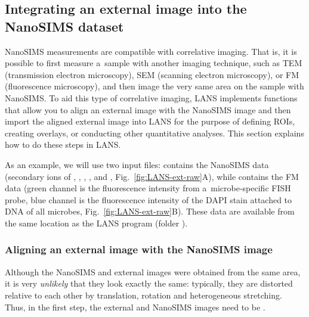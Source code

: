\subsection{Integrating an external image into the NanoSIMS dataset}
\setcounter{step}{0}

\goldbox{}
NanoSIMS measurements are compatible with correlative imaging. That is, it is possible to first measure a~sample with another imaging technique, such as TEM (transmission electron microscopy), SEM (scanning electron microscopy), or FM (fluorescence microscopy), and then image the very same area on the sample with NanoSIMS. To aid this type of correlative imaging, LANS implements functions that allow you to align an external image with the NanoSIMS image and then import the aligned external image into LANS for the purpose of defining ROIs, creating overlays, or conducting other quantitative analyses. This section explains how to do these steps in LANS.
\tcbe

As an example, we will use two input files:  contains the NanoSIMS data (secondary ions of , , , ,  and , Fig.~\ref{fig:LANS-ext-raw}A), while  contains the FM data (green channel is the fluorescence intensity from a~microbe-specific FISH probe, blue channel is the fluorescence intensity of the DAPI stain attached to DNA of all microbes, Fig.~\ref{fig:LANS-ext-raw}B). These data are available from the same location as the LANS program (folder ).

\subsubsection{Aligning an external image with the NanoSIMS image}
\setcounter{step}{0}

\goldbox{}
Although the NanoSIMS and external images were obtained from the same area, it is very \emph{unlikely} that they look exactly the same: typically, they are distorted relative to each other by translation, rotation and heterogeneous stretching. Thus, in the first step, the external and NanoSIMS images need to be .
\tcbe



